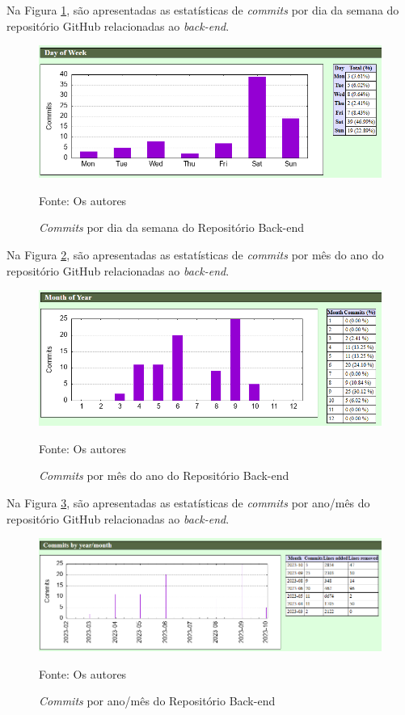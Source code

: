 \begin{apendicesenv}
Na Figura \ref{dayOfWeekBackend}, são apresentadas as estatísticas de \textit{commits} por dia da semana do repositório GitHub relacionadas ao \textit{back-end}.

\begin{figure}[H]
	\centering
	\includegraphics[scale=0.7]{./imagens/metricas/gitStatsBackend/activity/dayOfWeek.png}
	\caption{\textit{Commits} por dia da semana do Repositório Back-end}
	Fonte: Os autores
    \label{dayOfWeekBackend}
\end{figure}
\pagebreak

Na Figura \ref{monthOfYearBackend}, são apresentadas as estatísticas de \textit{commits} por mês do ano do repositório GitHub relacionadas ao \textit{back-end}.

\begin{figure}[H]
	\centering
	\includegraphics[scale=0.7]{./imagens/metricas/gitStatsBackend/activity/monthOfYear.png}
	\caption{\textit{Commits} por mês do ano do Repositório Back-end}
	Fonte: Os autores
    \label{monthOfYearBackend}
\end{figure}

Na Figura \ref{commitsBackend}, são apresentadas as estatísticas de \textit{commits} por ano/mês do repositório GitHub relacionadas ao \textit{back-end}.

\begin{figure}[H]
	\centering
	\includegraphics[scale=0.6]{./imagens/metricas/gitStatsBackend/activity/commits.png}
	\caption{\textit{Commits} por ano/mês do Repositório Back-end}
	Fonte: Os autores
    \label{commitsBackend}
\end{figure}
\pagebreak


\end{apendicesenv}
